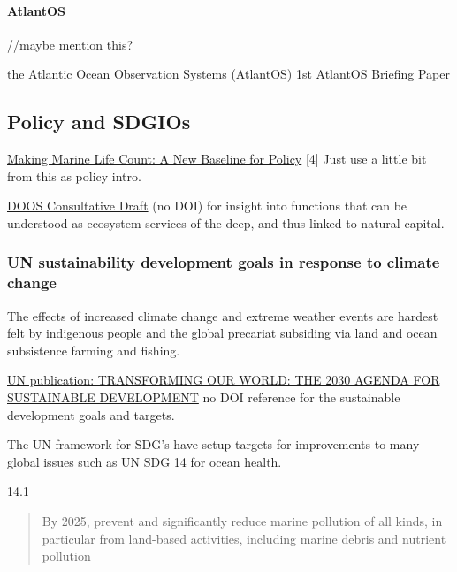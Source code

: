 \documentclass[]{article}
\let\oldparagraph\paragraph
\renewcommand{\paragraph}[1]{\oldparagraph{#1}\mbox{}}
\begin{document}
\hypertarget{atlantos}{%
\paragraph{AtlantOS}\label{atlantos}}

//maybe mention this?

the Atlantic Ocean Observation Systems (AtlantOS)
\href{https://www.atlantos-h2020.eu/2017/02/10/1st-atlantos-briefing-paper/}{1st
AtlantOS Briefing Paper}

\hypertarget{policy-and-sdgios}{%
\subsection{Policy and SDGIOs}\label{policy-and-sdgios}}

\href{http://journals.plos.org/plosbiology/article?id=10.1371/journal.pbio.1000531}{Making
Marine Life Count: A New Baseline for Policy} {[}4{]} Just use a little
bit from this as policy intro.

\href{http://deepoceanobserving.org/wp-content/uploads/2017/07/DOOS-Consultative-Draft-V5-1-2017-06-19.pdf}{DOOS
Consultative Draft} (no DOI) for insight into functions that can be
understood as ecosystem services of the deep, and thus linked to natural
capital.

\hypertarget{un-sustainability-development-goals-in-response-to-climate-change}{%
\subsubsection{UN sustainability development goals in response to
climate
change}\label{un-sustainability-development-goals-in-response-to-climate-change}}

The effects of increased climate change and extreme weather events are
hardest felt by indigenous people and the global precariat subsiding via
land and ocean subsistence farming and fishing.

\href{https://sustainabledevelopment.un.org/content/documents/21252030\%20Agenda\%20for\%20Sustainable\%20Development\%20web.pdf}{UN
publication: TRANSFORMING OUR WORLD: THE 2030 AGENDA FOR SUSTAINABLE
DEVELOPMENT} no DOI reference for the sustainable development goals and
targets.

The UN framework for SDG's have setup targets for improvements to many
global issues such as UN SDG 14 for ocean health.

14.1

\begin{quote}
By 2025, prevent and significantly reduce marine pollution of all kinds,
in particular from land-based activities, including marine debris and
nutrient pollution
\end{quote}
\end{document}
